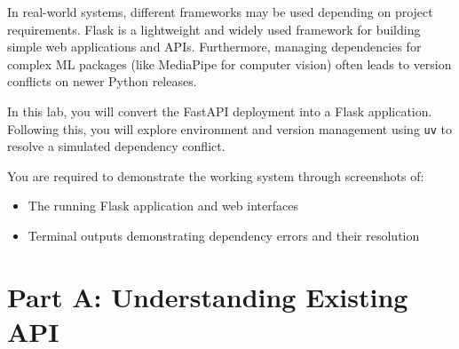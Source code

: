 \documentclass[12pt,a4paper]{article}
\begin{document}
In real-world systems, different frameworks may be used depending on project requirements. Flask is a lightweight and widely used framework for building simple web applications and APIs. Furthermore, managing dependencies for complex ML packages (like MediaPipe for computer vision) often leads to version conflicts on newer Python releases.

In this lab, you will convert the FastAPI deployment into a Flask application. Following this, you will explore environment and version management using \texttt{uv} to resolve a simulated dependency conflict.

You are required to demonstrate the working system through screenshots of:
\begin{itemize}
\item The running Flask application and web interfaces
\item Terminal outputs demonstrating dependency errors and their resolution
\end{itemize}


\section*{Part A: Understanding Existing API}
\end{document}

